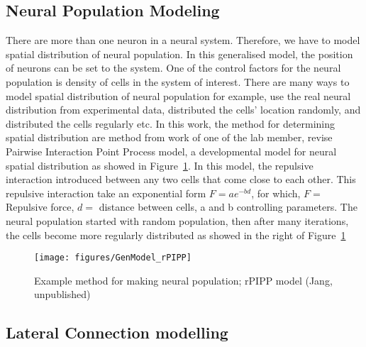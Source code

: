 \subsection{Neural Population Modeling}
There are more than one neuron in a neural system. Therefore, we have to model spatial distribution of neural population.  In this generalised model, the position of neurons can be set to the system. One of the control factors for  the neural population is density of cells in the system of interest.  There are many ways to model spatial distribution of neural population for example, use the real neural distribution from experimental data, distributed the cells' location randomly, and distributed the cells regularly etc. In this work, the method for determining spatial distribution are method from work of one of the lab member, revise Pairwise Interaction Point Process model, a developmental model for neural spatial distribution as showed in Figure~\ref{fig:rPIPP}.
In this model, the repulsive interaction introduced between any two cells that come close to each other. This repulsive interaction take an exponential form $F = a e^{-bd}$, for which, $F =$ Repulsive force, $d = $ distance between cells, a and b controlling parameters. The neural population started with random population, then after many iterations,  the cells become more regularly distributed as showed in the right of Figure~\ref{fig:rPIPP}

\begin{figure}[!h]
	\centering
	\texttt{[image: figures/GenModel\_rPIPP]}
	\caption{Example method for making neural population; rPIPP model (Jang, unpublished)}
	\label{fig:rPIPP}
\end{figure} 

\subsection{Lateral Connection modelling}

